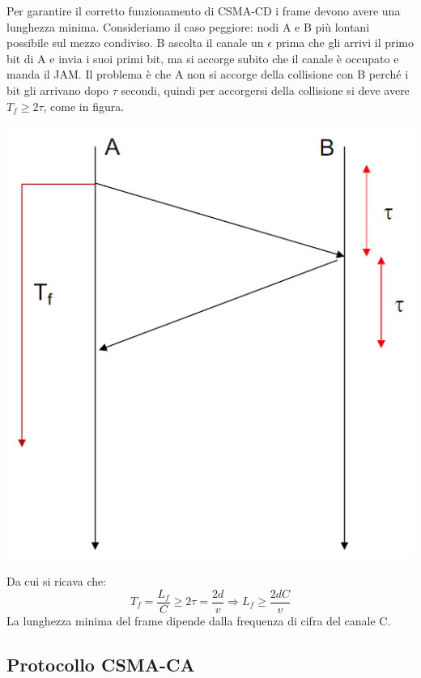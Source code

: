 \documentclass[12pt]{article}
\begin{document}
Per garantire il corretto funzionamento di CSMA-CD i frame devono avere una lunghezza minima. Consideriamo il caso peggiore: nodi A e B più lontani possibile sul mezzo condiviso. B ascolta il canale un $\epsilon$ prima che gli arrivi il primo bit di A e invia i suoi primi bit, ma si accorge subito che il canale è occupato e manda il JAM. Il problema è che A non si accorge della collisione con B perché i bit gli arrivano dopo $\tau$ secondi, quindi per accorgersi della collisione si deve avere $T_f \geq 2\tau$, come in figura.
\begin{center}
    \includegraphics[scale=0.4]{csma_cd_frame_min_length}
\end{center}
Da cui si ricava che:
\begin{equation*}
    T_f = \frac{L_f}{C} \geq 2\tau = \frac{2d}{v} \Rightarrow L_f \geq \frac{2dC}{v}
\end{equation*}
La lunghezza minima del frame dipende dalla frequenza di cifra del canale C.

\subsection{Protocollo CSMA-CA}
\end{document}
